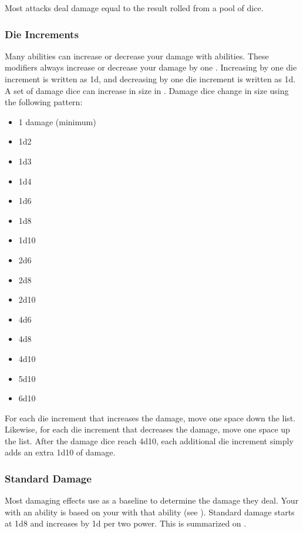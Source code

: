         Most attacks deal damage equal to the result rolled from a pool of dice.

        \subsubsection{Die Increments}\label{Die Increments}
            Many abilities can increase or decrease your damage with abilities.
            These modifiers always increase or decrease your damage by one .
            Increasing by one die increment is written as \plus1d, and decreasing by one die increment is written as \minus1d.
            A set of damage dice can increase in size in .
            Damage dice change in size using the following pattern:
            \begin{itemize}
                \item 1 damage (minimum)
                \item 1d2
                \item 1d3
                \item 1d4
                \item 1d6
                \item 1d8
                \item 1d10
                \item 2d6
                \item 2d8
                \item 2d10
                \item 4d6
                \item 4d8
                \item 4d10
                \item 5d10
                \item 6d10
            \end{itemize}

            For each die increment that increases the damage, move one space down the list.
            Likewise, for each die increment that decreases the damage, move one space up the list.
            After the damage dice reach 4d10, each additional die increment simply adds an extra 1d10 of damage.

        \subsubsection{Standard Damage}\label{Standard Damage}
            Most damaging effects use  as a baseline to determine the damage they deal.
            Your  with an ability is based on your  with that ability (see ).
            Standard damage starts at 1d8 and increases by \plus1d per two power.
            This is summarized on .

